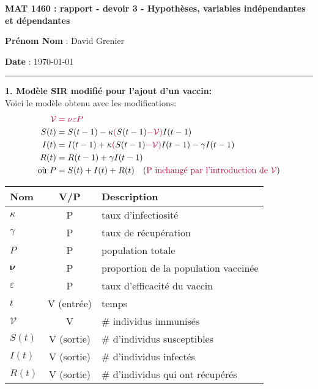 \documentclass[12pt,leqno]{article}
\newcommand\modif{\color{purple}}
\begin{document}
{\bf \large MAT 1460 : rapport - devoir 3 - Hypoth\`eses, variables ind\'ependantes et d\'ependantes}


\medskip
{\bf Pr\'enom Nom} : David Grenier

{\bf Date} : \today

\bigskip
\bigskip

\hrule height0.3pt
\bigskip

\noindent
{\bfseries 1. Mod\`ele SIR modifi\'e pour l'ajout d'un vaccin:}\\
Voici le mod\`ele obtenu avec les {\modif modifications}:
\begin{align*}
    \modif \mathcal V &\modif = \nu\varepsilon P\\
    S(t) &= S(t-1) - \kappa {\modif(}S(t-1){\modif -\mathcal V)}I(t-1)\\
    I(t) &= I(t-1) + \kappa {\modif(}S(t-1){\modif -\mathcal V)}I(t-1) - \gamma I(t-1)\\
    R(t) &= R(t-1) + \gamma I(t-1)\\
    \text{o\`u } P &= S(t) + I(t) + R(t) \text{\quad({\modif P inchang\'e par l'introduction de $\mathcal V$})}
\end{align*}

\begin{table}[h]
    \centering
    \begin{tabular}{|l|c|l|}\hline
        Nom &V/P &Description\\\hline
        $\kappa$ &P &taux d'infectiosit\'e\\\hline
        $\gamma$ &P &taux de r\'ecup\'eration\\\hline
        $P$ &P &population totale\\\hline
        \modif$\boldsymbol\nu$ &\modif P &\modif proportion de la population vaccin\'ee\\\hline
        \modif$\varepsilon$ &\modif P &\modif taux d'efficacit\'e du vaccin\\\hline
        $t$ &V (entr\'ee) &temps\\\hline
        \modif$\mathcal V$ &\modif V &\modif \# individus immunis\'es\\\hline
        $S(t)$ &V (sortie) &\# d'individus susceptibles\\\hline
        $I(t)$ &V (sortie) &\# d'individus infect\'es\\\hline
        $R(t)$ &V (sortie) &\# d'individus qui ont r\'ecup\'er\'es\\\hline
    \end{tabular}
\end{table}
\end{document}
